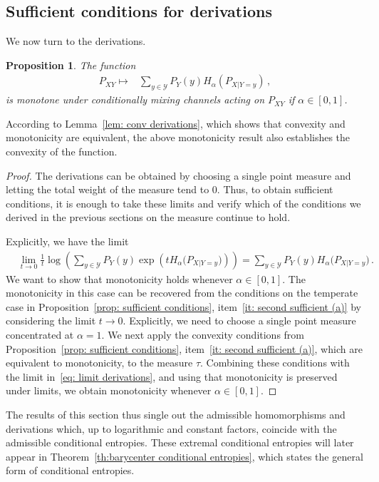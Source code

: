 \documentclass[aps,pra,11pt,onecolumn,nofootinbib,tightenlines]{revtex4-2}
\newtheorem{proposition}[theorem]{Proposition}
\theoremstyle{definition}
\newcommand{\Y}{\mathcal{Y}}
\begin{document}
\subsection{Sufficient conditions for derivations}
We now turn to the derivations. 
\begin{proposition}
 \label{prop: sufficient derivations}
 The function
 \begin{align}
      P_{XY} \longmapsto &\sum_{y \in \Y} P_Y(y)  H_\alpha(P_{X|Y=y}) \,,
 \end{align}
 is monotone under conditionally mixing channels acting on $P_{XY}$ if $\alpha \in [0,1]$.
 \end{proposition}
 According to Lemma~\ref{lem: conv derivations}, which shows that convexity and monotonicity are equivalent, the above monotonicity result also establishes the convexity of the function.
 \begin{proof}
 The derivations can be obtained by choosing a single point measure and letting the total weight of the measure tend to $0$. Thus, to obtain sufficient conditions, it is enough to take these limits and verify which of the conditions we derived in the previous sections on the measure continue to hold. 
    
Explicitly, we have the limit
    \begin{align}
     \label{eq: limit derivations}
 &\lim_{t \to 0} \frac{1}{t} 
 \log\left( \sum_{y \in \mathcal{Y}} P_Y(y) 
 \exp\left( t H_\alpha\big(P_{X|Y = y}\big)  \right) \right) = \sum_{y \in \mathcal{Y}} P_Y(y)  H_\alpha\big(P_{X|Y = y}\big)  \,.
 \end{align}
 We want to show that monotonicity holds whenever $\alpha \in [0,1]$.
 The monotonicity in this case can be recovered from the conditions on the temperate case in Proposition~\ref{prop: sufficient conditions}, item~\ref{it: second sufficient (a)} by considering the limit $t\to 0$. Explicitly, we need to choose a single point measure concentrated at $\alpha=1$.
We next apply the convexity conditions from Proposition~\ref{prop: sufficient conditions}, item~\ref{it: second sufficient (a)}, which are equivalent to monotonicity, to the measure $\tau$.
Combining these conditions with the limit in~\eqref{eq: limit derivations}, and using that monotonicity is preserved under limits, we obtain monotonicity whenever $\alpha \in [0,1]$.
\end{proof}


The results of this section thus single out the admissible homomorphisms and derivations which, up to logarithmic and constant factors, coincide with the admissible conditional entropies. These extremal conditional entropies will later appear in Theorem~\ref{th:barycenter conditional entropies}, which states the general form of conditional entropies.
\end{document}
